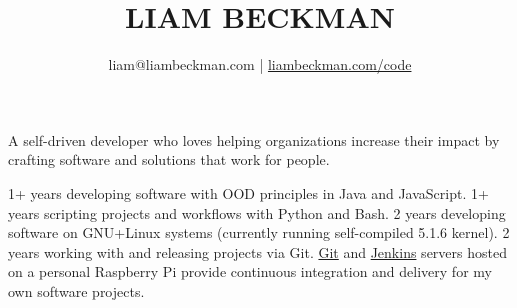 


\title{\textcolor{my-red}{LIAM BECKMAN}}
\author{liam@liambeckman.com | \href{https://liambeckman.com/code}{liambeckman.com/code}}

\date{\vspace{-5ex}}



\maketitle

\begin{center}
    A self-driven developer who loves helping organizations increase their impact by crafting software and solutions that work for people.
\end{center}





\vspace{-1em}
\begin{itemize}[label=$\triangleright$]
    1+ years developing software with OOD principles in Java and JavaScript.
    1+ years scripting projects and workflows with Python and Bash.
    2 years developing software on GNU+Linux systems (currently running self-compiled 5.1.6 kernel).
    2 years working with and releasing projects via Git. \textcolor{my-blue}{\href{https://git.liambeckman.com/}{Git}} and \textcolor{my-blue}{\href{https://liambeckman.com/jenkins/blue/organizations/jenkins/pipelines/}{Jenkins}} servers hosted on a personal Raspberry Pi provide continuous integration and delivery for my own software projects.
\end{itemize}

\medbreak









\vfill


\pagebreak





